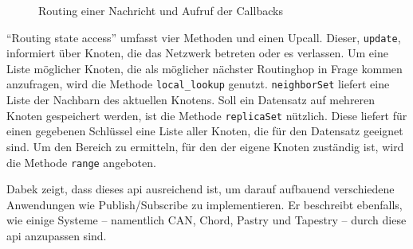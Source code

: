 \begin{figure}[htbp]
\centering
{}
\caption{Routing einer Nachricht und Aufruf der Callbacks}
\label{fig:routing_kbr}
\end{figure}


\enquote{Routing state access} umfasst vier Methoden und einen Upcall. Dieser, \texttt{update}, informiert über Knoten, die das Netzwerk betreten oder es verlassen. Um eine Liste möglicher Knoten, die als möglicher nächster Routinghop in Frage kommen anzufragen, wird die Methode \texttt{local\_lookup} genutzt. \texttt{neighborSet} liefert eine Liste der Nachbarn des aktuellen Knotens. Soll ein Datensatz auf mehreren Knoten gespeichert werden, ist die Methode \texttt{replicaSet} nützlich. Diese liefert für einen gegebenen Schlüssel eine Liste aller Knoten, die für den Datensatz geeignet sind. Um den Bereich zu ermitteln, für den der eigene Knoten zuständig ist, wird die Methode \texttt{range} angeboten.

Dabek zeigt, dass dieses \acf{api} ausreichend ist, um darauf aufbauend verschiedene Anwendungen wie Publish/Subscribe zu implementieren. Er beschreibt ebenfalls, wie einige Systeme -- namentlich CAN, Chord, Pastry und Tapestry -- durch diese \ac{api} anzupassen sind.
